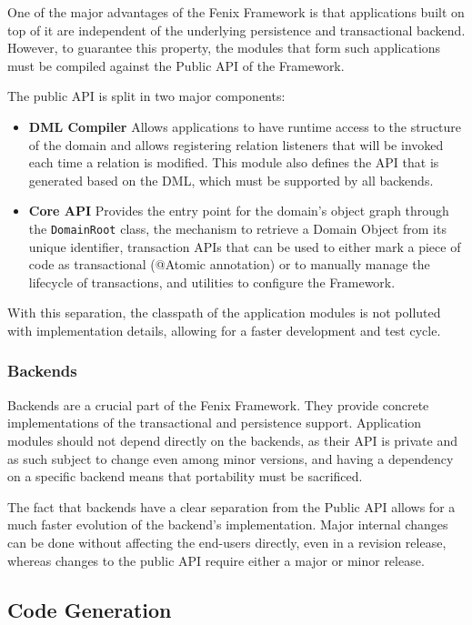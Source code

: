 \documentclass{llncs}
\begin{document}
One of the major advantages of the Fenix Framework is that
applications built on top of it are independent of the underlying
persistence and transactional backend. However, to guarantee this
property, the modules that form such applications must be compiled
against the Public API of the Framework.

The public API is split in two major components:

\begin{itemize}
\item {\bf DML Compiler} Allows applications to have runtime access to
  the structure of the domain and allows registering relation
  listeners that will be invoked each time a relation is
  modified. This module also defines the API that is generated based
  on the DML, which must be supported by all backends.

\item {\bf Core API} Provides the entry point for the domain's object
graph through the \texttt{DomainRoot} class, the mechanism to retrieve a
Domain Object from its unique identifier, transaction APIs that can be
used to either mark a piece of code as transactional (@Atomic
annotation) or to manually manage the lifecycle of transactions, and
utilities to configure the Framework.
\end{itemize}

With this separation, the classpath of the application modules is not
polluted with implementation details, allowing for a faster
development and test cycle.

\subsubsection{Backends}

Backends are a crucial part of the Fenix Framework. They provide
concrete implementations of the transactional and persistence
support. Application modules should not depend directly on the
backends, as their API is private and as such subject to change even
among minor versions, and having a dependency on a specific backend
means that portability must be sacrificed.

The fact that backends have a clear separation from the Public API
allows for a much faster evolution of the backend's
implementation. Major internal changes can be done without affecting
the end-users directly, even in a revision release, whereas changes to
the public API require either a major or minor release.

\subsection{Code Generation}
\label{sec:codeGen}
\end{document}
